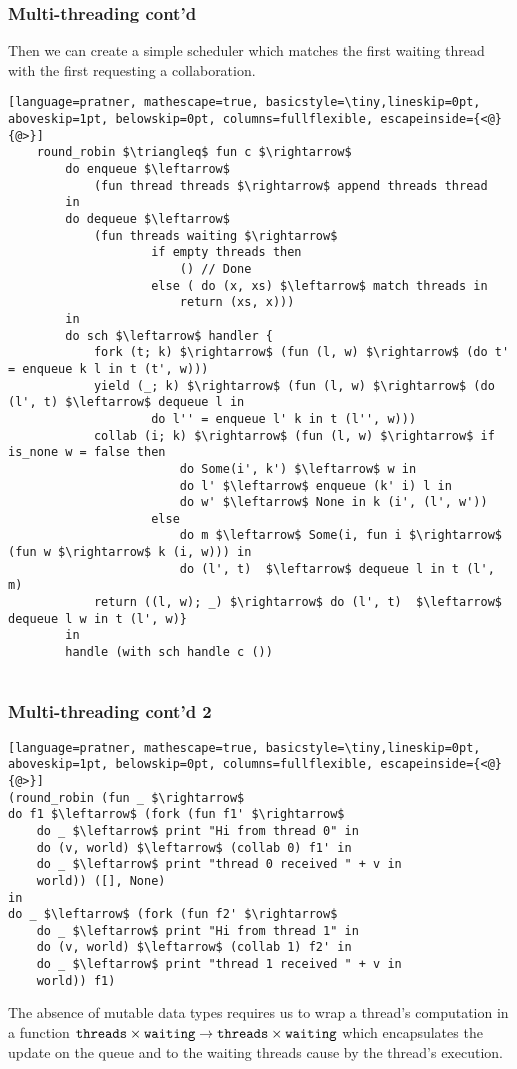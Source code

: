 \documentclass[t]{beamer}
\begin{document}
\begin{frame}[fragile]
	\frametitle{Multi-threading cont'd}
	
	Then we can create a simple scheduler which matches the first waiting thread with the first requesting a collaboration.
	
	\begin{lstlisting}[language=pratner, mathescape=true, basicstyle=\tiny,lineskip=0pt, aboveskip=1pt, belowskip=0pt, columns=fullflexible, escapeinside={<@}{@>}]
	round_robin $\triangleq$ fun c $\rightarrow$ 
		do enqueue $\leftarrow$ 
			(fun thread threads $\rightarrow$ append threads thread 
		in 
		do dequeue $\leftarrow$
			(fun threads waiting $\rightarrow$
					if empty threads then 
						() // Done
					else ( do (x, xs) $\leftarrow$ match threads in 
						return (xs, x)))
		in
		do sch $\leftarrow$ handler {
			fork (t; k) $\rightarrow$ (fun (l, w) $\rightarrow$ (do t' = enqueue k l in t (t', w)))
			yield (_; k) $\rightarrow$ (fun (l, w) $\rightarrow$ (do (l', t) $\leftarrow$ dequeue l in 
					do l'' = enqueue l' k in t (l'', w)))
			collab (i; k) $\rightarrow$ (fun (l, w) $\rightarrow$ if is_none w = false then
					    do Some(i', k') $\leftarrow$ w in 
					    do l' $\leftarrow$ enqueue (k' i) l in 
					    do w' $\leftarrow$ None in k (i', (l', w'))
					else 
					    do m $\leftarrow$ Some(i, fun i $\rightarrow$ (fun w $\rightarrow$ k (i, w))) in 
					    do (l', t)  $\leftarrow$ dequeue l in t (l', m)
			return ((l, w); _) $\rightarrow$ do (l', t)  $\leftarrow$ dequeue l w in t (l', w)}
		in 
		handle (with sch handle c ())
		
	\end{lstlisting}  
	
	
\end{frame}

\begin{frame}[fragile]
	\frametitle{Multi-threading cont'd 2}
	\begin{lstlisting}[language=pratner, mathescape=true, basicstyle=\tiny,lineskip=0pt, aboveskip=1pt, belowskip=0pt, columns=fullflexible, escapeinside={<@}{@>}]
(round_robin (fun _ $\rightarrow$
do f1 $\leftarrow$ (fork (fun f1' $\rightarrow$ 
	do _ $\leftarrow$ print "Hi from thread 0" in
	do (v, world) $\leftarrow$ (collab 0) f1' in 
	do _ $\leftarrow$ print "thread 0 received " + v in
	world)) ([], None)
in
do _ $\leftarrow$ (fork (fun f2' $\rightarrow$ 
	do _ $\leftarrow$ print "Hi from thread 1" in
	do (v, world) $\leftarrow$ (collab 1) f2' in
	do _ $\leftarrow$ print "thread 1 received " + v in
	world)) f1)
	\end{lstlisting}
	
	The absence of mutable data types requires us to wrap a thread's computation in a function $\verb|threads| \times \verb|waiting| \rightarrow \verb|threads| \times \verb|waiting|$ which encapsulates the update on the queue and to the waiting threads cause by the thread's execution.
	
\end{frame}
\end{document}

